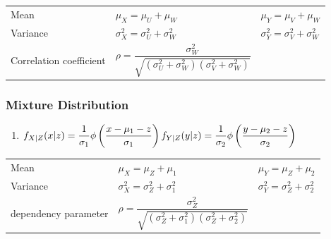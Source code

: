 \renewcommand{\arraystretch}{2}
\begin{table}[H]
    \begin{tabular}{l l l}
        Mean & $\mu_X = \mu_U + \mu_W $ & $ \mu_Y = \mu_V + \mu_W$ \\

        Variance & $\sigma^2_X = \sigma^2_U + \sigma^2_W $ & $ \sigma^2_Y = \sigma^2_V + \sigma^2_W$ \\

        Correlation coefficient & $
            \rho = \dfrac{\sigma_W^2}{
                \sqrt{(\sigma^2_U + \sigma^2_W)(\sigma^2_V + \sigma^2_W)}
            }
        $ & \\
    \end{tabular}
\end{table}
\renewcommand{\arraystretch}{1}


\subsubsection{Mixture Distribution \cite{ism-1}} \label{Normal distribution: Bivariate/ Multivariate: Mixture Distribution}

\begin{enumerate}
    \item $
        \hfill
        f_{X|Z}(x|z) = \dfrac{1}{\sigma_1}
        \phi\dParenBrac{\dfrac{x-\mu_1-z}{\sigma_1} }
        \hfill
        f_{Y|Z}(y|z) = \dfrac{1}{\sigma_2}
        \phi\dParenBrac{\dfrac{y-\mu_2-z}{\sigma_2} }
        \hfill
    $ \cite{ism-1}

    
\end{enumerate}

\begin{table}[H]
    \centering
    \begin{tabular}{l l l}
        Mean & $\mu_X = \mu_Z + \mu_1$ & $\mu_Y = \mu_Z + \mu_2$ \\

        Variance & $\sigma^2_X = \sigma^2_Z + \sigma^2_1$ & $\sigma^2_Y = \sigma^2_Z + \sigma^2_2$ \\

        dependency parameter & $
            \rho
            = \dfrac{\sigma^2_Z}{
                \sqrt{(\sigma^2_Z + \sigma^2_1)(\sigma^2_Z + \sigma^2_2)}
            }
        $
    \end{tabular}
\end{table}


